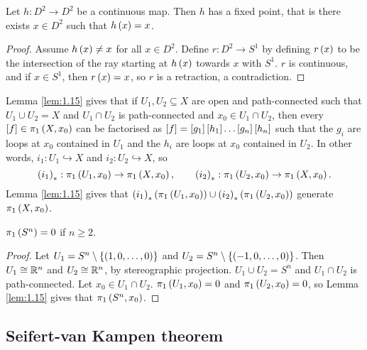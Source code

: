 \begin{theorem}
Let $ h : D^2 \to D^2 $ be a continuous map. Then $ h $ has a fixed point, that is there exists $ x \in D^2 $ such that $ h\rb{x} = x $.
\end{theorem}

\begin{proof}
Assume $ h\rb{x} \ne x $ for all $ x \in D^2 $. Define $ r : D^2 \to S^1 $ by defining $ r\rb{x} $ to be the intersection of the ray starting at $ h\rb{x} $ towards $ x $ with $ S^1 $. $ r $ is continuous, and if $ x \in S^1 $, then $ r\rb{x} = x $, so $ r $ is a retraction, a contradiction.
\end{proof}

Lemma \ref{lem:1.15} gives that if $ U_1, U_2 \subseteq X $ are open and path-connected such that $ U_1 \cup U_2 = X $ and $ U_1 \cap U_2 $ is path-connected and $ x_0 \in U_1 \cap U_2 $, then every $ \sb{f} \in \pi_1\rb{X, x_0} $ can be factorised as $ \sb{f} = \sb{g_1}\sb{h_1} \dots \sb{g_n}\sb{h_n} $ such that the $ g_i $ are loops at $ x_0 $ contained in $ U_1 $ and the $ h_i $ are loops at $ x_0 $ contained in $ U_2 $. In other words, $ i_1 : U_1 \hookrightarrow X $ and $ i_2 : U_2 \hookrightarrow X $, so
$$ \rb{i_1}_* : \pi_1\rb{U_1, x_0} \to \pi_1\rb{X, x_0}, \qquad \rb{i_2}_* : \pi_1\rb{U_2, x_0} \to \pi_1\rb{X, x_0}. $$
Lemma \ref{lem:1.15} gives that $ \rb{i_1}_*\rb{\pi_1\rb{U_1, x_0}} \cup \rb{i_2}_*\rb{\pi_1\rb{U_2, x_0}} $ generate $ \pi_1\rb{X, x_0} $.

\begin{proposition}
$ \pi_1\rb{S^n} = 0 $ if $ n \ge 2 $.
\end{proposition}

\begin{proof}
Let $ U_1 = S^n \setminus \cb{\rb{1, 0, \dots, 0}} $ and $ U_2 = S^n \setminus \cb{\rb{-1, 0, \dots, 0}} $. Then $ U_1 \cong \R^n $ and $ U_2 \cong \R^n $, by stereographic projection. $ U_1 \cup U_2 = S^n $ and $ U_1 \cap U_2 $ is path-connected. Let $ x_0 \in U_1 \cap U_2 $. $ \pi_1\rb{U_1, x_0} = 0 $ and $ \pi_1\rb{U_2, x_0} = 0 $, so Lemma \ref{lem:1.15} gives that $ \pi_1\rb{S^n, x_0} $.
\end{proof}

\pagebreak

\subsection{Seifert-van Kampen theorem}

